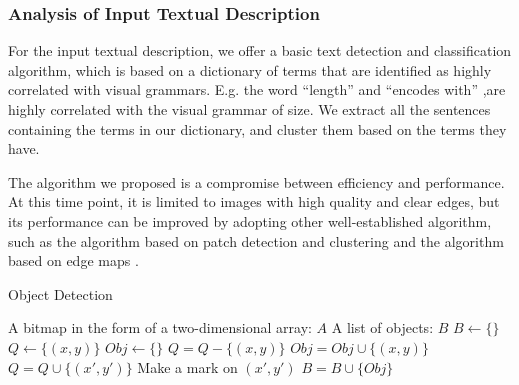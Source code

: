 \subsubsection{Analysis of Input Textual Description}
For the input textual description, we offer a basic text detection and classification algorithm, which is based on a dictionary of terms that are identified as highly correlated with visual grammars. E.g. the word ``length'' and ``encodes with'' ,are highly correlated with the  visual grammar of size. We extract all the sentences containing the terms in our dictionary, and cluster them based on the terms they have.

The algorithm we proposed is a compromise between efficiency and performance. At this time point, it is limited to images with high quality and clear edges, but its performance can be improved by adopting other well-established algorithm, such as the algorithm based on patch detection and clustering \cite{savva_revision:_2011} and the algorithm based on edge maps \cite{huang2003model}.

\begin{algorithm} 
        \caption{Object Detection}  
        \label{alg:alg1}
        \begin{algorithmic} %
            \Require A bitmap in the form of a two-dimensional array: $A$
            \Ensure A list of objects: $B$
            \State $B \gets \{\}$
                    \State $Q \gets \{(x,y)\} $
                    \State $Obj \gets \{\}$
                        \State $Q = Q - \{(x,y)\}$
                        \State $Obj = Obj \cup \{(x,y)\}$
                                \State $Q = Q \cup \{(x',y')\}$
                                \State Make a mark on $(x',y')$
                            \EndIf
                        \EndFor
                    \EndFor
                    \State $B = B \cup \{Obj\}$
                \EndIf
            \EndFor
            \State {}
        \end{algorithmic}  
    \end{algorithm} 
    
